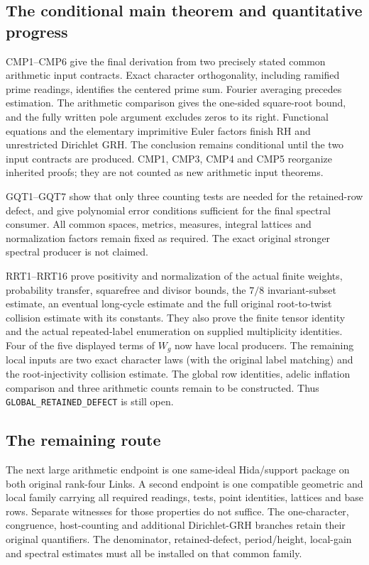 \documentclass[11pt,a4paper]{article}
\numberwithin{equation}{section}
\theoremstyle{remark}\newtheorem{remark}[theorem]{Remark}
\begin{document}
\subsection{The conditional main theorem and quantitative progress}

CMP1--CMP6 give the final derivation from two precisely stated common
arithmetic input contracts. Exact character orthogonality, including
ramified prime readings, identifies the centered prime sum. Fourier
averaging precedes estimation. The arithmetic comparison gives the
one-sided square-root bound, and the fully written pole argument
excludes zeros to its right. Functional equations and the elementary
imprimitive Euler factors finish RH and unrestricted Dirichlet GRH.
The conclusion remains conditional until the two input contracts are
produced. CMP1, CMP3, CMP4 and CMP5 reorganize inherited proofs; they
are not counted as new arithmetic input theorems.

GQT1--GQT7 show that only three counting tests are needed for the
retained-row defect, and give polynomial error conditions sufficient
for the final spectral consumer. All common spaces, metrics, measures,
integral lattices and normalization factors remain fixed as required.
The exact original stronger spectral producer is not claimed.

RRT1--RRT16 prove positivity and normalization of the actual finite
weights, probability transfer, squarefree and divisor bounds, the
$7/8$ invariant-subset estimate, an eventual long-cycle estimate and
the full original root-to-twist collision estimate with its constants.
They also prove the finite tensor identity and the actual repeated-label
enumeration on supplied multiplicity identities. Four of the five
displayed terms of $W_g$ now have local producers. The remaining local
inputs are two exact character laws (with the original label matching)
and the root-injectivity collision estimate. The global row identities,
adelic inflation comparison and three arithmetic counts remain to be
constructed. Thus \texttt{GLOBAL\_\allowbreak RETAINED\_\allowbreak DEFECT} is still open.

\subsection{The remaining route}

The next large arithmetic endpoint is one same-ideal Hida/support
package on both original rank-four Links. A second endpoint is one
compatible geometric and local family carrying all required readings,
tests, point identities, lattices and base rows. Separate witnesses
for those properties do not suffice. The one-character, congruence,
host-counting and additional Dirichlet-GRH branches retain their original
quantifiers. The denominator, retained-defect, period/height, local-gain
and spectral estimates must all be installed on that common family.
\end{document}
